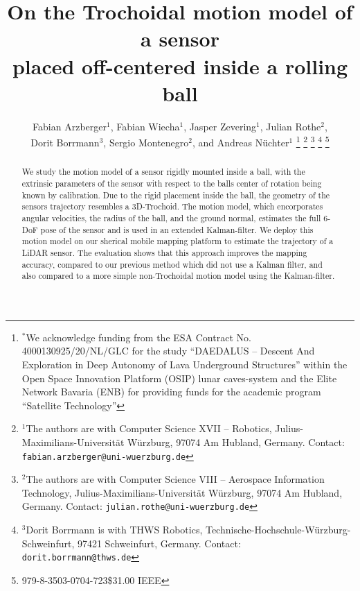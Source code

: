 \documentclass[a4paper, 10pt, conference]{ieeeconf}      %
\title{\LARGE \bf
On the Trochoidal motion model of a sensor\\placed off-centered inside a rolling ball
}
\author{Fabian Arzberger$^{1}$, Fabian Wiecha$^{1}$, Jasper Zevering$^{1}$, Julian Rothe$^{2}$,\\Dorit Borrmann$^{3}$, Sergio Montenegro$^{2}$, and Andreas N{\"u}chter$^{1}$%
\thanks{$^{*}$We acknowledge funding from the ESA Contract No. 4000130925/20/NL/GLC for the study ``DAEDALUS -- Descent And Exploration in Deep Autonomy of Lava Underground Structures'' within the Open Space Innovation Platform (OSIP) lunar caves-system and the Elite Network Bavaria (ENB) for providing funds for the academic program ``Satellite Technology''}%
\thanks{$^{1}$The authors are with Computer Science XVII -- Robotics,
        Julius-Maximilians-Universit{\"a}t W{\"u}rzburg, 97074 Am Hubland, Germany.
        {Contact: \tt\small fabian.arzberger@uni-wuerzburg.de}}%
\thanks{$^{2}$The authors are with Computer Science VIII -- Aerospace Information Technology,
Julius-Maximilians-Universit{\"a}t W{\"u}rzburg, 97074 Am Hubland, Germany.
        {Contact: \tt\small julian.rothe@uni-wuerzburg.de}}%
\thanks{$^{3}$Dorit Borrmann is with THWS Robotics,
Technische-Hochschule-W{\"u}rzburg-Schweinfurt, 97421 Schweinfurt, Germany.
        {Contact: \tt\small dorit.borrmann@thws.de}}%
\thanks{979-8-3503-0704-7\/23\/\$31.00 \textcopyright2023 IEEE}
}
\begin{document}
\maketitle
\thispagestyle{empty}
\pagestyle{empty}


\begin{abstract}
We study the motion model of a sensor rigidly mounted inside a ball, with the extrinsic parameters of the sensor with respect to the balls center of rotation being known by calibration.
Due to the rigid placement inside the ball, the geometry of the sensors trajectory resembles a 3D-Trochoid.
The motion model, which encorporates angular velocities, the radius of the ball, and the ground normal, estimates the full 6-DoF pose of the sensor and is used in an extended Kalman-filter.
We deploy this motion model on our sherical mobile mapping platform to estimate the trajectory of a LiDAR sensor.
The evaluation shows that this approach improves the mapping accuracy, compared to our previous method which did not use a Kalman filter, and also compared to a more simple non-Trochoidal motion model using the Kalman-filter.     

\end{abstract}












% 
% 
\end{document}
